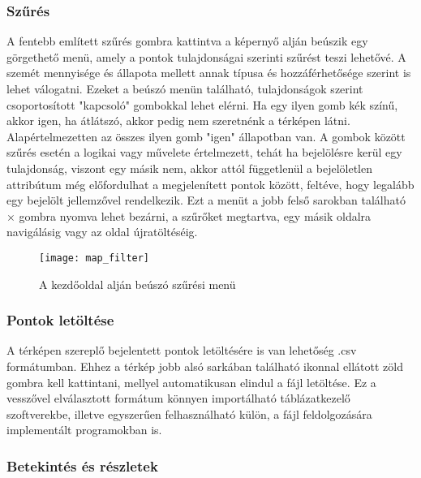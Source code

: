\subsubsection{Szűrés}

A fentebb említett szűrés gombra kattintva a képernyő alján beúszik egy görgethető menü, amely a pontok tulajdonságai szerinti szűrést teszi lehetővé. A szemét mennyisége és állapota mellett annak típusa és hozzáférhetősége szerint is lehet válogatni. Ezeket a beúszó menün található, tulajdonságok szerint csoportosított "kapcsoló" gombokkal lehet elérni. Ha egy ilyen gomb kék színű, akkor igen, ha átlátszó, akkor pedig nem szeretnénk a térképen látni. Alapértelmezetten az összes ilyen gomb "igen" állapotban van. A gombok között szűrés esetén a logikai vagy művelete értelmezett, tehát ha bejelölésre kerül egy tulajdonság, viszont egy másik nem, akkor attól függetlenül a bejelöletlen attribútum még előfordulhat a megjelenített pontok között, feltéve, hogy legalább egy bejelölt jellemzővel rendelkezik. Ezt a menüt a jobb felső sarokban található \hspace{0.1cm}\boldmath\(\times\)\hspace{0.1cm} gombra nyomva lehet bezárni, a szűrőket megtartva, egy másik oldalra navigálásig vagy az oldal újratöltéséig.

\begin{figure}[H]
	\centering
	\texttt{[image: map\_filter]}
	\caption{A kezdőoldal alján beúszó szűrési menü}
	\label{fig:map_filter}
\end{figure}

\subsubsection{Pontok letöltése}

A térképen szereplő bejelentett pontok letöltésére is van lehetőség .csv formátumban. Ehhez a térkép jobb alsó sarkában található \hspace{0.1cm}\hspace{0.1cm} ikonnal ellátott zöld gombra kell kattintani, mellyel automatikusan elindul a fájl letöltése. Ez a vesszővel elválasztott formátum könnyen importálható táblázatkezelő szoftverekbe, illetve egyszerűen felhasználható külön, a fájl feldolgozására implementált programokban is.

\subsubsection{Betekintés és részletek}

